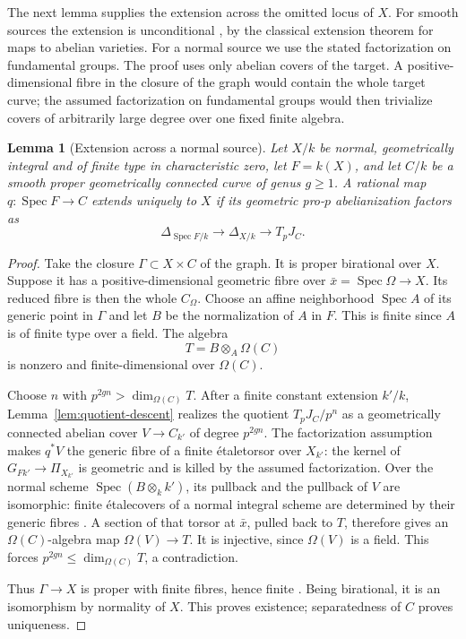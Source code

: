 \documentclass[11pt,a4paper]{article}
\numberwithin{equation}{section}
\theoremstyle{plain}
\newtheorem{lemma}[theorem]{Lemma}
\theoremstyle{definition}
\theoremstyle{remark}
\newcommand{\etale}{\'etale}
\DeclareMathOperator{\Spec}{Spec}
\begin{document}
The next lemma supplies the extension across the omitted locus of $X$.
For smooth sources the extension is unconditional
\cite[Lemma~16.3]{Mochizuki1999}, by the classical extension theorem
for maps to abelian varieties. For a normal source we use the stated
factorization on fundamental groups. The proof uses only abelian
covers of the target. A positive-dimensional
fibre in the closure of the graph would contain the whole target curve;
the assumed factorization on fundamental groups would then trivialize
covers of arbitrarily large degree over one fixed finite algebra.

\begin{lemma}[Extension across a normal source]
\label{lem:normal-extension}
Let $X/k$ be normal, geometrically integral and of finite type in
characteristic zero, let $F=k(X)$, and let $C/k$ be a smooth proper geometrically connected curve of
genus $g\ge1$. A rational map $q:\Spec F\to C$ extends uniquely to
$X$ if its geometric pro-$p$ abelianization factors as
\[
 \Delta_{\Spec F/k}\longrightarrow\Delta_{X/k}
                         \longrightarrow T_pJ_C.
\]
\end{lemma}
\begin{proof}
Take the closure $\Gamma\subset X\times C$ of the graph. It is proper
birational over $X$. Suppose it has a positive-dimensional geometric
fibre over $\bar x=\Spec\Omega\to X$. Its reduced fibre is then the
whole $C_\Omega$. Choose an affine neighborhood $\Spec A$ of its generic
point in $\Gamma$ and let $B$ be the normalization of $A$ in $F$.
This is finite since $A$ is of finite type over a field. The algebra
\[
             T=B\otimes_A\Omega(C)
\]
is nonzero and finite-dimensional over $\Omega(C)$.

Choose $n$ with $p^{2gn}>\dim_{\Omega(C)}T$.
After a finite constant extension $k'/k$,
Lemma~\ref{lem:quotient-descent} realizes the quotient
$T_pJ_C/p^n$ as a geometrically connected abelian cover $V\to C_{k'}$
of degree $p^{2gn}$. The factorization assumption makes $q^*V$ the
generic fibre of a finite \etale torsor over $X_{k'}$: the kernel of
$G_{Fk'}\to\Pi_{X_{k'}}$ is geometric and is killed by the assumed
factorization. Over the normal
scheme $\Spec(B\otimes_k k')$, its pullback and the pullback of $V$
are isomorphic: finite \etale covers of a normal integral scheme are
determined by their generic fibres
\cite[Expos\'e~I, Corollaires~10.2--10.3]{SGA1}.
A section of that torsor at $\bar x$, pulled back to $T$, therefore gives
an $\Omega(C)$-algebra map $\Omega(V)\to T$. It is injective, since
$\Omega(V)$ is a field. This forces
$p^{2gn}\le\dim_{\Omega(C)}T$, a contradiction.

Thus $\Gamma\to X$ is proper with finite fibres, hence finite
\cite[Expos\'e~VIII, Th\'eor\`eme~6.1]{SGA1}.
Being birational, it is an isomorphism by normality of $X$.
This proves existence;
separatedness of $C$ proves uniqueness. 
\end{proof}
\end{document}
